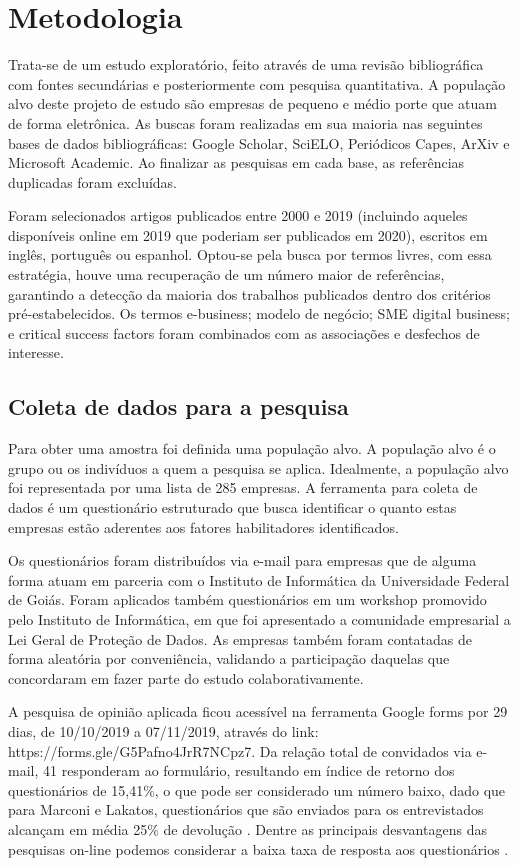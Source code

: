 \chapter{Metodologia}
\label{cap:texto}

Trata-se de um estudo exploratório, feito através de uma revisão bibliográfica com fontes secundárias e posteriormente com pesquisa quantitativa. A população alvo deste projeto de estudo são empresas de pequeno e médio porte que atuam de forma eletrônica. As buscas foram realizadas em sua maioria nas seguintes bases de dados bibliográficas: Google Scholar, SciELO, Periódicos Capes, ArXiv e Microsoft Academic. Ao finalizar as pesquisas em cada base, as referências duplicadas foram excluídas. 

Foram selecionados artigos publicados entre 2000 e 2019 (incluindo aqueles disponíveis online em 2019 que poderiam ser publicados em 2020), escritos em inglês, português ou espanhol. Optou-se pela busca por termos livres, com essa estratégia, houve uma recuperação de um número maior de referências, garantindo a detecção da maioria dos trabalhos publicados dentro dos critérios pré-estabelecidos. Os termos e-business; modelo de negócio; SME digital business; e critical success factors foram combinados com as associações e desfechos de interesse.

\section{Coleta de dados para a pesquisa}
\label{sec:figs}
 
Para obter uma amostra foi definida uma população alvo. A população alvo é o grupo ou os indivíduos a quem a pesquisa se aplica. Idealmente, a população alvo foi representada por uma lista de 285 empresas. A ferramenta para coleta de dados é um questionário estruturado que busca identificar o quanto estas empresas estão aderentes aos fatores habilitadores identificados.

Os questionários foram distribuídos via e-mail para empresas que de alguma forma atuam em parceria com o Instituto de Informática da Universidade Federal de Goiás. Foram aplicados também questionários em um workshop promovido pelo Instituto de Informática, em que foi apresentado a comunidade empresarial a Lei Geral de Proteção de Dados. As empresas também foram contatadas de forma aleatória por conveniência, validando a participação daquelas que concordaram em fazer parte do estudo colaborativamente.

A pesquisa de opinião aplicada ficou acessível na ferramenta Google forms por 29 dias, de 10/10/2019 a 07/11/2019, através do link: https://forms.gle/G5Pafno4JrR7NCpz7. Da relação total de convidados via e-mail, 41 responderam ao formulário, resultando em índice de retorno dos questionários de 15,41\%, o que pode ser considerado um número baixo, dado que para Marconi e Lakatos, questionários que são enviados para os entrevistados alcançam em média 25\% de devolução \cite{marconilakatos2005}. Dentre as principais desvantagens das pesquisas on-line podemos considerar a baixa taxa de resposta aos questionários \cite{henrique2010}.

